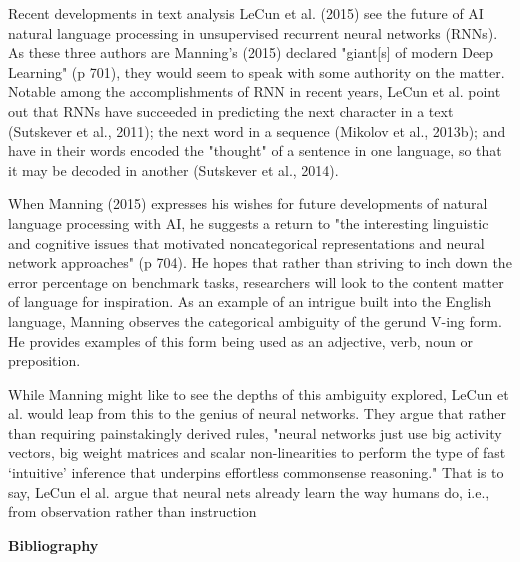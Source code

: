 \documentclass[11pt]{article}
\begin{document}
\begin{section}{Recent developments in text analysis }
LeCun et al. (2015) see the future of AI natural language processing in unsupervised recurrent neural networks (RNNs). As these three authors are Manning's (2015) declared "giant[s] of modern Deep Learning" (p 701), they would seem to speak with some authority on the matter. Notable among the accomplishments of RNN in recent years, LeCun et al. point out that RNNs have succeeded in predicting the next character in a text (Sutskever et al., 2011); the next word in a sequence (Mikolov et al., 2013b); and have in their words encoded the "thought" of a sentence in one language, so that it may be decoded in another (Sutskever et al., 2014).

When Manning (2015) expresses his wishes for future developments of natural language processing with AI, he suggests a return to "the interesting linguistic and cognitive issues that motivated noncategorical representations and neural network approaches" (p 704). He hopes that rather than striving to inch down the error percentage on benchmark tasks, researchers will look to the content matter of language for inspiration. As an example of an intrigue built into the English language, Manning observes the categorical ambiguity of the gerund V-ing form. He provides examples of this form being used as an adjective, verb, noun or preposition.

While Manning might like to see the depths of this ambiguity explored, LeCun et al. would leap from this to the genius of neural networks. They argue that rather than requiring painstakingly derived rules, "neural networks just use big activity vectors, big weight matrices and scalar non-linearities to perform the type of fast ‘intuitive’ inference that underpins effortless commonsense reasoning." That is to say, LeCun el al. argue that neural nets already learn the way humans do, i.e., from observation rather than instruction



\end{section}



\newpage %
\thispagestyle{plain}

\begin{center}
\Large
\textbf{Bibliography}
\vspace{0.4cm}
\end{center}
\end{document}
